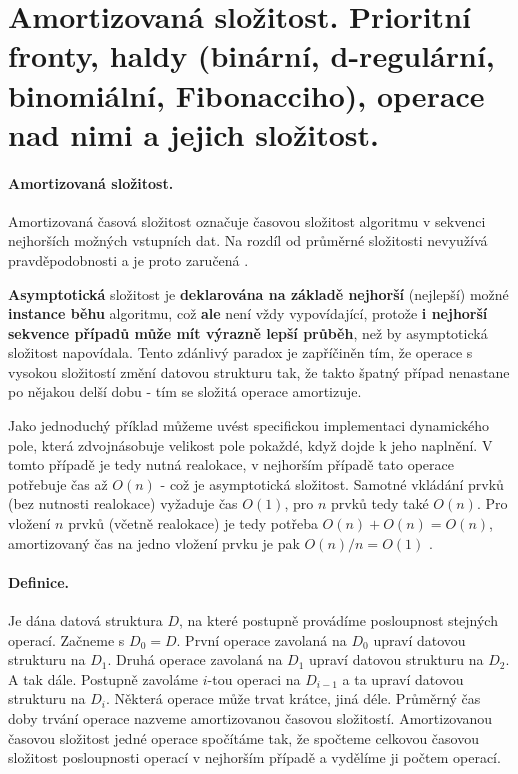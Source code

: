 \section[PAL - Složitost, fronty, haldy]{Amortizovaná složitost. Prioritní fronty, haldy (binární, d-regulární, binomiální, Fibonacciho), operace nad nimi a jejich složitost.}

\paragraph{Amortizovaná složitost.} Amortizovaná časová složitost označuje časovou složitost algoritmu v sekvenci nejhorších možných vstupních dat. Na rozdíl od průměrné složitosti nevyužívá pravděpodobnosti a je proto zaručená \cite{algoritmy:amortizovanaslozitost}.

\textbf{Asymptotická} složitost je \textbf{deklarována na základě nejhorší} (nejlepší) možné \textbf{instance běhu} algoritmu, což \textbf{ale} není vždy vypovídající, protože \textbf{i nejhorší sekvence případů může mít výrazně lepší průběh}, než by asymptotická složitost napovídala. Tento zdánlivý paradox je zapříčiněn tím, že operace s vysokou složitostí změní datovou strukturu tak, že takto špatný případ nenastane po nějakou delší dobu - tím se složitá operace amortizuje.

Jako jednoduchý příklad můžeme uvést specifickou implementaci dynamického pole, která zdvojnásobuje velikost pole pokaždé, když dojde k jeho naplnění. V tomto případě je tedy nutná realokace, v nejhorším případě tato operace potřebuje čas až $O(n)$ - což je asymptotická složitost. Samotné vkládání prvků (bez nutnosti realokace) vyžaduje čas $O(1)$, pro $n$ prvků tedy také $O(n)$. Pro vložení $n$ prvků (včetně realokace) je tedy potřeba $O(n) + O(n) = O(n)$, amortizovaný čas na jedno vložení prvku je pak $O(n)/n = O(1)$ \cite{wiki:amortizovana}.

\paragraph{Definice.} Je dána datová struktura $D$, na které postupně provádíme posloupnost stejných operací. Začneme s $D_0 = D$. První operace zavolaná na $D_0$ upraví datovou strukturu na $D_1$. Druhá operace zavolaná na $D_1$ upraví datovou strukturu na $D_2$. A tak dále. Postupně zavoláme $i$-tou operaci na $D_{i-1}$ a ta upraví datovou strukturu na $D_i$. Některá operace může trvat krátce, jiná déle. Průměrný čas doby trvání operace nazveme amortizovanou časovou složitostí. Amortizovanou časovou složitost jedné operace spočítáme tak, že spočteme celkovou časovou složitost posloupnosti operací v nejhorším případě a vydělíme ji počtem operací.


